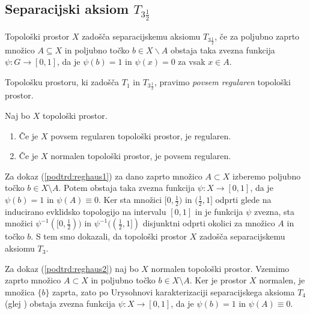 \documentclass[mat1]{fmfdelo}
\begin{document}
\subsection{Separacijski aksiom $T_{3 \frac{1}{2}}$}

\begin{definicija}
	Topološki prostor $X$ zadošča separacijskemu aksiomu $T_{3 \frac{1}{2}}$, če za poljubno zaprto množico $A \subseteq X$ in poljubno točko $b \in X\backslash A$ obstaja taka zvezna funkcija $\psi\colon G \to [0, 1]$, da je $\psi (b) = 1$ in $\psi (x) = 0$ za vsak $x \in A$.
\end{definicija}

\begin{definicija}
	Topološku prostoru, ki zadošča $T_1$ in $T_{3 \frac{1}{2}}$, pravimo \emph{povsem regularen} topološki prostor.
\end{definicija}


\begin{trditev}\label{pos:reghaus}
Naj bo $X$ topološki prostor.
\begin{enumerate}
\item Če je $X$ povsem regularen topološki prostor, je regularen.\label{podtrd:reghaus1}
\item Če je $X$ normalen topološki prostor, je povsem regularen.\label{podtrd:reghaus2}
\end{enumerate}
\end{trditev}

\begin{dokaz}
Za dokaz (\ref{podtrd:reghaus1}) za dano zaprto množico $A \subset X$ izberemo poljubno točko $b \in X \setminus A$. Potem obstaja taka zvezna funkcija $\psi\colon X \to [0, 1]$, da je $\psi(b) = 1$ in $\psi(A) \equiv 0$.
Ker sta množici $[0, \frac{1}{2})$ in $(\frac{1}{2}, 1]$ odprti glede na inducirano evklidsko topologijo na intervalu $[0, 1]$ in je funkcija $\psi$ zvezna, sta množici $\psi^{-1}([0, \frac{1}{2}))$ in $\psi^{-1}((\frac{1}{2}, 1])$ disjunktni odprti okolici za množico $A$ in točko $b$.
S tem smo dokazali, da topološki prostor $X$ zadošča separacijskemu aksiomu $T_3$.

Za dokaz (\ref{podtrd:reghaus2}) naj bo $X$ normalen topološki prostor. 
Vzemimo zaprto množico $A \subset X$ in poljubno točko $b \in X \setminus A$.
Ker je prostor $X$ normalen, je množica $\lbrace b \rbrace$ zaprta,
zato po Urysohnovi karakterizaciji separacijskega aksioma $T_4$ (glej \cite{bib:top}) obstaja zvezna funkcija $\psi\colon X \to [0, 1]$, da je $\psi(b) = 1$ in $\psi(A) \equiv 0$.
\end{dokaz}
\end{document}
